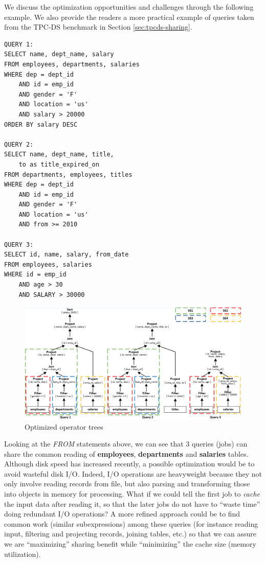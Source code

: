 We discuss the optimization opportunities and challenges through the following example. We also provide the readers a more practical example of queries taken from the TPC-DS benchmark \cite{tpcds} in Section \ref{sec:tpcds-sharing}.

\begingroup
\fontsize{7pt}{8pt}
\selectfont
\begin{verbatim}
QUERY 1:
SELECT name, dept_name, salary
FROM employees, departments, salaries
WHERE dep = dept_id
	AND id = emp_id
	AND gender = 'F'
	AND location = 'us'
	AND salary > 20000
ORDER BY salary DESC

QUERY 2:
SELECT name, dept_name, title, 
	to as title_expired_on
FROM departments, employees, titles
WHERE dep = dept_id
	AND id = emp_id
	AND gender = 'F'
	AND location = 'us'
	AND from >= 2010

QUERY 3:
SELECT id, name, salary, from_date
FROM employees, salaries
WHERE id = emp_id
	AND age > 30
	AND SALARY > 30000
\end{verbatim}
\endgroup

\begin{figure}[htbp]
	\centering
	\includegraphics[scale=0.65]{figures/common_sub}
	\caption{Optimized operator trees} 
	\label{fig:common_sub}
\end{figure}

Looking at the \emph{FROM} statements above, we can see that 3 queries (jobs) can share the common reading of \textbf{employees}, \textbf{departments} and \textbf{salaries} tables. Although disk speed has increased recently, a possible optimization would be to avoid wasteful disk I/O. Indeed, I/O operations are heavyweight because they not only involve reading records from file, but also parsing and transforming those into objects in memory for processing. What if we could tell the first job to \emph{cache} the input data after reading it, so that the later jobs do not have to ``waste time'' doing redundant I/O operations? A more refined approach could be to find common work (similar subexpressions) among these queries (for instance reading input, filtering and projecting records, joining tables, etc.) so that we can assure we are ``maximizing'' sharing benefit while ``minimizing'' the cache size (memory utilization).

